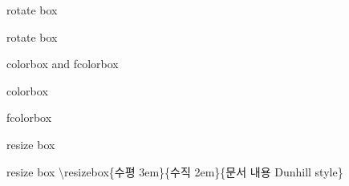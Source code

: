 \documentclass[ aspectratio=149,  10pt,blue,xcolor=pdftex,dvipsnames,table,handout,notes]{beamer}
\begin{document}
		\begin{frame}[t]{rotate box}


			\begin{block} {rotate box}
			\end{block}

		\note[item]{}
		\end{frame}


		\begin{frame}[t]{colorbox and fcolorbox}


			\begin{block} {colorbox}
			\end{block}


			\begin{block} {fcolorbox}
			\end{block}

		\note[item]{}
		\end{frame}



		\begin{frame}[t]{resize box}


			\begin{block} {resize box}
			\textbackslash resizebox\{수평 3em\}\{수직 2em\}\{문서 내용 Dunhill style\}

			\end{block}

			\begin{example}
		 \\
		 \\
		 \\
		 \\
		 \\

%
			\end{example}


		\note[item]{}
		\end{frame}
\end{document}
